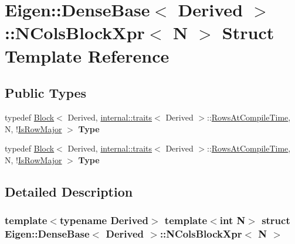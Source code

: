 \hypertarget{struct_eigen_1_1_dense_base_1_1_n_cols_block_xpr}{}\section{Eigen\+:\+:Dense\+Base$<$ Derived $>$\+:\+:N\+Cols\+Block\+Xpr$<$ N $>$ Struct Template Reference}
\label{struct_eigen_1_1_dense_base_1_1_n_cols_block_xpr}
\subsection*{Public Types}
\begin{DoxyCompactItemize}
\item 
\mbox{\label{struct_eigen_1_1_dense_base_1_1_n_cols_block_xpr_a30874549fb3d98a13c7f8fd7f04bc3d8}} 
typedef \hyperlink{group___core___module_class_eigen_1_1_block}{Block}$<$ Derived, \hyperlink{struct_eigen_1_1internal_1_1traits}{internal\+::traits}$<$ Derived $>$\+::\hyperlink{group___core___module_a9784b8701c2d1c79fa8000e1b3ebdb8ba41d81bf4037b4d74c03b1242d8c133c0}{Rows\+At\+Compile\+Time}, N, !\hyperlink{group___core___module_a9784b8701c2d1c79fa8000e1b3ebdb8baff2add9b7e8426ba05be33f32806d21c}{Is\+Row\+Major} $>$ {\bfseries Type}
\item 
\mbox{\label{struct_eigen_1_1_dense_base_1_1_n_cols_block_xpr_a30874549fb3d98a13c7f8fd7f04bc3d8}} 
typedef \hyperlink{group___core___module_class_eigen_1_1_block}{Block}$<$ Derived, \hyperlink{struct_eigen_1_1internal_1_1traits}{internal\+::traits}$<$ Derived $>$\+::\hyperlink{group___core___module_a9784b8701c2d1c79fa8000e1b3ebdb8ba41d81bf4037b4d74c03b1242d8c133c0}{Rows\+At\+Compile\+Time}, N, !\hyperlink{group___core___module_a9784b8701c2d1c79fa8000e1b3ebdb8baff2add9b7e8426ba05be33f32806d21c}{Is\+Row\+Major} $>$ {\bfseries Type}
\end{DoxyCompactItemize}


\subsection{Detailed Description}
\subsubsection*{template$<$typename Derived$>$\newline
template$<$int N$>$\newline
struct Eigen\+::\+Dense\+Base$<$ Derived $>$\+::\+N\+Cols\+Block\+Xpr$<$ N $>$}



